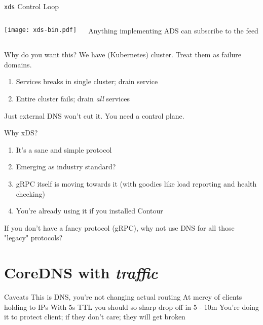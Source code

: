 \documentclass[aspectratio=169]{beamer}
\begin{document}
    \begin{frame}[plain]{\texttt{xds} Control Loop}
        \begin{columns}
            \begin{column}{0.5\textwidth}
                \texttt{[image: xds-bin.pdf]}
            \end{column}
            \begin{column}{0.5\textwidth}
                Anything implementing ADS can subscribe to the feed
            \end{column}
        \end{columns}
    \end{frame}

    \begin{frame}{Why do you want this?}
        We have (Kubernetes) cluster. Treat them as failure domains.
        \begin{enumerate}
            \item Services breaks in single cluster; drain service
            \item Entire cluster fails; drain \emph{all} services
        \end{enumerate}
        Just external DNS won't cut it. You need a control plane.
    \end{frame}

    \begin{frame}{Why xDS?}
        \begin{enumerate}
            \item It's a sane and simple protocol
            \item Emerging as industry standard?
            \item gRPC itself is moving towards it (with goodies like load reporting and health checking)
            \item You're already using it if you installed Contour
        \end{enumerate}
        If you don't have a fancy protocol (gRPC), why not use DNS for all those "legacy" protocols?
    \end{frame}

    \section{CoreDNS with \emph{traffic}}

    \begin{frame}{Caveats}
        This is DNS, you're not changing actual routing
        At mercy of clients holding to IPs
        With 5s TTL you should so sharp drop off in 5 - 10m
        You're doing it to protect client; if they don't care; they will get broken
    \end{frame}
\end{document}
